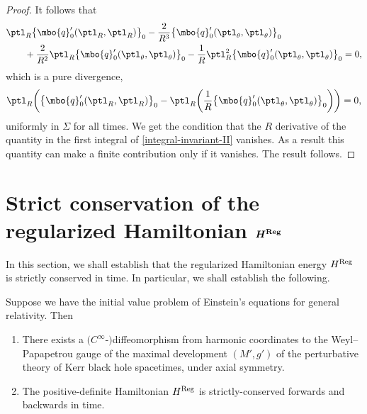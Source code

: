 \begin{proof}
It follows that
\begin{align*}
&\ptl_R \bigl\{ \mbo{q}'_0 (\ptl_R, \ptl_R) \bigr\}_0 - \frac{2}{R^3} \bigl\{ \mbo{q}'_0 (\ptl_\theta, \ptl_\theta) \bigr\}_0 \notag\\
& \qquad{} + \frac{2}{R^2} \ptl_R \bigl\{ \mbo{q}'_0 (\ptl_\theta, \ptl_\theta) \bigr\}_0 -
\frac{1}{R} \ptl^2_R \bigl\{ \mbo{q}'_0 (\ptl_\theta, \ptl_\theta) \bigr\}_0 =0,
\end{align*}
which is a pure divergence,
\begin{align*}
\ptl_R \biggl(\bigl\{ \mbo{q}'_0 (\ptl_R, \ptl_R) \bigr\}_0 - \ptl_R \biggl( \frac{1}{R} \bigl\{ \mbo{q}'_0 (\ptl_\theta, \ptl_\theta) \bigr\}_0 \biggr) \biggr) = 0,
\end{align*}
uniformly in $\Sigma$ for all times. We get the condition that the $R$ derivative of the quantity in the first integral of \eqref{integral-invariant-II} vanishes. As a result this quantity can make a finite contribution only if it vanishes. The result follows.
\end{proof}

\section{Strict conservation of the regularized Hamiltonian \texorpdfstring{$\boldsymbol{H^{{\rm Reg}}}$}{H\string^\{Reg\}}}\label{section8}

In this section, we shall establish that the regularized Hamiltonian energy $H^{{\rm Reg}}$ is strictly conserved in time. In particular, we shall establish the following.

\begin{Theorem}
	Suppose we have the initial value problem of Einstein's equations for general relativity. Then
	\begin{enumerate}\itemsep=0pt
		\item[$(1)$] There exists a $(C^\infty$-$)$diffeomorphism from harmonic coordinates to the Weyl--Papapetrou gauge of the maximal development $(M', g')$ of the perturbative theory of Kerr black hole spacetimes, under axial symmetry.
		
		\item[$(2)$] The positive-definite Hamiltonian $H^{{\rm Reg}}$ is strictly-conserved forwards and backwards in time.
	\end{enumerate}
\end{Theorem}

